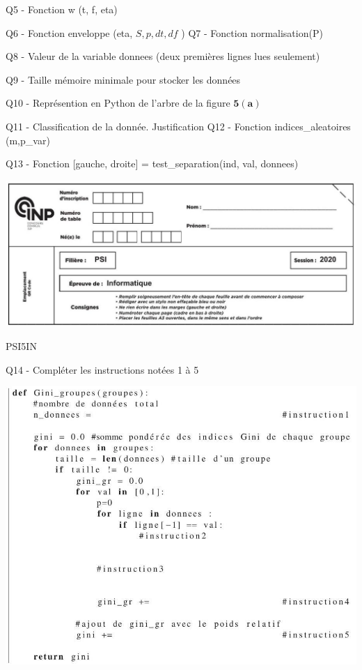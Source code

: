 \documentclass[10pt]{article}
\begin{document}
Q5 - Fonction w (t, f, eta)

Q6 - Fonction enveloppe (eta, $S, p, d t, d f$ ) Q7 - Fonction normalisation(P)

Q8 - Valeur de la variable donnees (deux premières lignes lues seulement)

Q9 - Taille mémoire minimale pour stocker les données

Q10 - Représention en Python de l'arbre de la figure $\mathbf{5}(\mathbf{a})$

Q11 - Classification de la donnée. Justification Q12 - Fonction indices\_aleatoires (m,p\_var)

Q13 - Fonction [gauche, droite] = test\_separation(ind, val, donnees)

\includegraphics[max width=\textwidth]{2022_02_02_1af495ea60fb42b668bfg-17}

PSI5IN

Q14 - Compléter les instructions notées 1 à 5

\includegraphics[max width=\textwidth]{2022_02_02_1af495ea60fb42b668bfg-17(1)}
\end{document}
